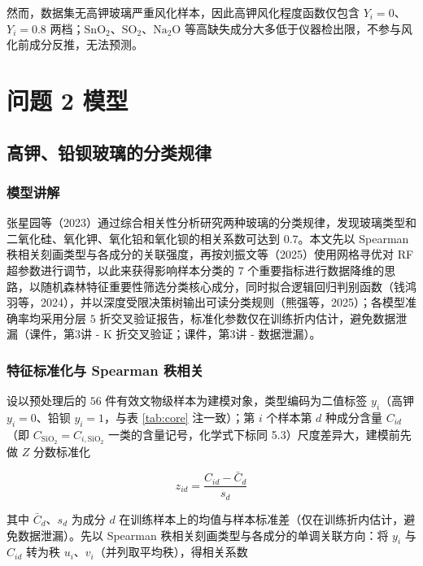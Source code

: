\documentclass{ctexart}
\begin{document}
然而，数据集无高钾玻璃严重风化样本，因此高钾风化程度函数仅包含 $Y_i=0$、$Y_i=0.8$ 两档；$\mathrm{SnO_2}$、$\mathrm{SO_2}$、$\mathrm{Na_2O}$ 等高缺失成分大多低于仪器检出限，不参与风化前成分反推，无法预测。

\section{问题 2 模型}

\subsection{高钾、铅钡玻璃的分类规律}

\subsubsection{模型讲解}

张星园等（2023）\cite{zhangxingyuan2023}通过综合相关性分析研究两种玻璃的分类规律，发现玻璃类型和二氧化硅、氧化钾、氧化铅和氧化钡的相关系数可达到 $0.7$。本文先以 Spearman 秩相关刻画类型与各成分的关联强度，再按刘振文等（2025）使用网格寻优对 RF 超参数进行调节，以此来获得影响样本分类的 $7$ 个重要指标进行数据降维的思路，以随机森林特征重要性筛选分类核心成分，同时拟合逻辑回归判别函数（钱鸿羽等，2024），并以深度受限决策树输出可读分类规则（熊强等，2025）；各模型准确率均采用分层 $5$ 折交叉验证报告，标准化参数仅在训练折内估计，避免数据泄漏（课件，第3讲 - K 折交叉验证；课件，第3讲 - 数据泄漏）\cite{kejian2026}。


\subsubsection{特征标准化与 Spearman 秩相关}

设以预处理后的 $56$ 件有效文物级样本为建模对象，类型编码为二值标签 $y_i$（高钾 $y_i=0$、铅钡 $y_i=1$，与表 \ref{tab:core} 注一致）；第 $i$ 个样本第 $d$ 种成分含量 $C_{id}$（即 $C_{\mathrm{SiO_2}}=C_{i,\mathrm{SiO_2}}$ 一类的含量记号，化学式下标同 5.3）尺度差异大，建模前先做 $Z$ 分数标准化

\begin{equation*}
z_{id}=\frac{C_{id}-\bar{C}_{d}}{s_{d}}
\end{equation*}

其中 $\bar C_d$、$s_d$ 为成分 $d$ 在训练样本上的均值与样本标准差（仅在训练折内估计，避免数据泄漏）。先以 Spearman 秩相关刻画类型与各成分的单调关联方向：将 $y_i$ 与 $C_{id}$ 转为秩 $u_i$、$v_i$（并列取平均秩），得相关系数
\end{document}
